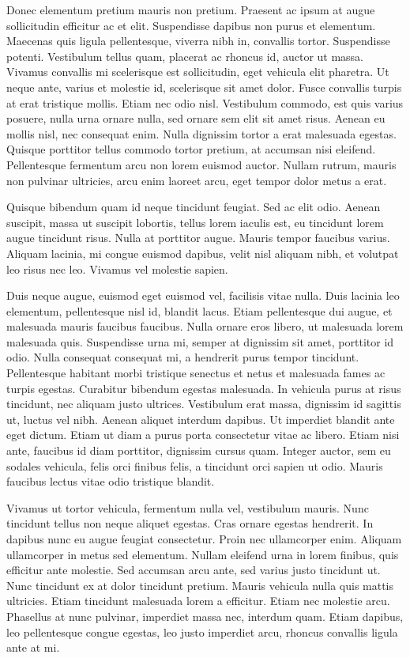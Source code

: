 \documentclass[11pt,english,]{memoir}
\begin{document}
Donec elementum pretium mauris non pretium. Praesent ac ipsum at augue sollicitudin efficitur ac et elit. Suspendisse dapibus non purus et elementum. Maecenas quis ligula pellentesque, viverra nibh in, convallis tortor. Suspendisse potenti. Vestibulum tellus quam, placerat ac rhoncus id, auctor ut massa. Vivamus convallis mi scelerisque est sollicitudin, eget vehicula elit pharetra. Ut neque ante, varius et molestie id, scelerisque sit amet dolor. Fusce convallis turpis at erat tristique mollis. Etiam nec odio nisl. Vestibulum commodo, est quis varius posuere, nulla urna ornare nulla, sed ornare sem elit sit amet risus. Aenean eu mollis nisl, nec consequat enim. Nulla dignissim tortor a erat malesuada egestas. Quisque porttitor tellus commodo tortor pretium, at accumsan nisi eleifend. Pellentesque fermentum arcu non lorem euismod auctor. Nullam rutrum, mauris non pulvinar ultricies, arcu enim laoreet arcu, eget tempor dolor metus a erat.

Quisque bibendum quam id neque tincidunt feugiat. Sed ac elit odio. Aenean suscipit, massa ut suscipit lobortis, tellus lorem iaculis est, eu tincidunt lorem augue tincidunt risus. Nulla at porttitor augue. Mauris tempor faucibus varius. Aliquam lacinia, mi congue euismod dapibus, velit nisl aliquam nibh, et volutpat leo risus nec leo. Vivamus vel molestie sapien.

Duis neque augue, euismod eget euismod vel, facilisis vitae nulla. Duis lacinia leo elementum, pellentesque nisl id, blandit lacus. Etiam pellentesque dui augue, et malesuada mauris faucibus faucibus. Nulla ornare eros libero, ut malesuada lorem malesuada quis. Suspendisse urna mi, semper at dignissim sit amet, porttitor id odio. Nulla consequat consequat mi, a hendrerit purus tempor tincidunt. Pellentesque habitant morbi tristique senectus et netus et malesuada fames ac turpis egestas. Curabitur bibendum egestas malesuada. In vehicula purus at risus tincidunt, nec aliquam justo ultrices. Vestibulum erat massa, dignissim id sagittis ut, luctus vel nibh. Aenean aliquet interdum dapibus. Ut imperdiet blandit ante eget dictum. Etiam ut diam a purus porta consectetur vitae ac libero. Etiam nisi ante, faucibus id diam porttitor, dignissim cursus quam. Integer auctor, sem eu sodales vehicula, felis orci finibus felis, a tincidunt orci sapien ut odio. Mauris faucibus lectus vitae odio tristique blandit.

Vivamus ut tortor vehicula, fermentum nulla vel, vestibulum mauris. Nunc tincidunt tellus non neque aliquet egestas. Cras ornare egestas hendrerit. In dapibus nunc eu augue feugiat consectetur. Proin nec ullamcorper enim. Aliquam ullamcorper in metus sed elementum. Nullam eleifend urna in lorem finibus, quis efficitur ante molestie. Sed accumsan arcu ante, sed varius justo tincidunt ut. Nunc tincidunt ex at dolor tincidunt pretium. Mauris vehicula nulla quis mattis ultricies. Etiam tincidunt malesuada lorem a efficitur. Etiam nec molestie arcu. Phasellus at nunc pulvinar, imperdiet massa nec, interdum quam. Etiam dapibus, leo pellentesque congue egestas, leo justo imperdiet arcu, rhoncus convallis ligula ante at mi.
\end{document}
